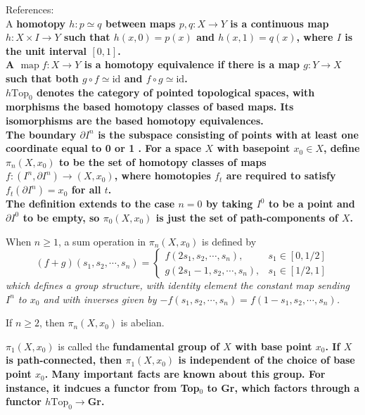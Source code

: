 References: \cite{mayConciseCourseAlgebraic1999}\\

A \bf{homotopy} $h: p \simeq q$ between maps $p, q: X \longrightarrow Y$ is a continuous map $h: X \times I \longrightarrow Y$ such that $h(x, 0)=p(x)$ and $h(x, 1)=q(x)$, where $I$ is the unit interval $[0,1]$.\\
A $\operatorname{map} f: X \longrightarrow Y$ is a \textbf{homotopy equivalence} if there is a map $g: Y \longrightarrow X$ such that both $g \circ f \simeq \mathrm{id}$ and $f \circ g \simeq \mathrm{id}$.\\
$h \text{Top}_0$ denotes the category of pointed topological spaces, with morphisms the based homotopy classes of based maps. Its isomorphisms are the based homotopy equivalences.\\

 The boundary $\partial I^n$ is the subspace consisting of points with at least one coordinate equal to 0 or 1 . For a space $X$ with basepoint $x_0 \in X$, define $\pi_n\left(X, x_0\right)$ to be the set of homotopy classes of maps $f:\left(I^n, \partial I^n\right) \rightarrow\left(X, x_0\right)$, where homotopies $f_t$ are required to satisfy $f_t\left(\partial I^n\right)=x_0$ for all $t$.\\
 The definition extends to the case $n=0$ by taking $I^0$ to be a point and $\partial I^0$ to be empty, so $\pi_0\left(X, x_0\right)$ is just the set of path-components of $X$.

When $n \geq 1$, a sum operation in $\pi_n\left(X, x_0\right)$ is defined by
$$
(f+g)\left(s_1, s_2, \cdots, s_n\right)= \begin{cases}f\left(2 s_1, s_2, \cdots, s_n\right), & s_1 \in[0,1 / 2] \\ g\left(2 s_1-1, s_2, \cdots, s_n\right), & s_1 \in[1 / 2,1]\end{cases}
$$
\textit{which defines a group structure, with identity element the constant map sending $I^n$ to $x_0$ and with inverses given by $-f\left(s_1, s_2, \cdots, s_n\right)=f\left(1-s_1, s_2, \cdots, s_n\right)$.}


\begin{prop}
    If $n \geq 2$, then $\pi_n\left(X, x_0\right)$ is abelian.
\end{prop}

$\pi_1(X,x_0)$ is called the \bf{fundamental group} of $X$ with base point $x_0$. If $X$ is path-connected, then $\pi_1(X,x_0)$ is independent of the choice of base point $x_0$. Many important facts are known about this group. For instance, it indcues a functor from Top$_0$ to Gr, which factors through a functor $h\text{Top}_0 \rightarrow $Gr.

